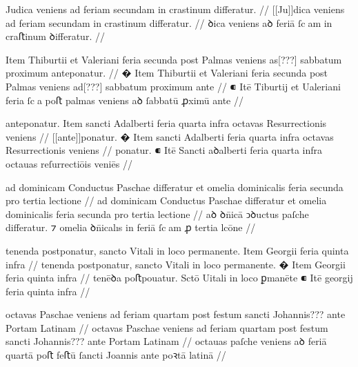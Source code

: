 \ex \bg
\gla
{}
Judica veniens ad feriam secundam
in crastinum differatur.
//
\glRekonstrukcja
{}
[[Ju]]dica veniens ad feriam secundam
in crastinum differatur.
//
\glU
{}
ꝺica veniens aꝺ feriā ſcam in craﬅinum ꝺiﬀeratur.
//
\endgl
\xe



\ex \bg
\gla
{}
{} Item Thiburtii et Valeriani feria secunda post Palmas veniens as[???]
sabbatum proximum anteponatur.
//
\glRekonstrukcja
{}
� Item Thiburtii et Valeriani feria secunda post Palmas veniens ad[???]
sabbatum proximum ante
//
\glU
{}
⁌ Itē Tiburtij et Ualeriani feria ſca poﬅ palmas veniens aꝺ ſabbatū ꝓximū ante
//
\endgl
\xe



\ex \bg
\gla
{}
anteponatur.
{} Item sancti Adalberti feria quarta infra octavas Resurrectionis
veniens
//
\glRekonstrukcja
{}
[[ante]]ponatur.
� Item sancti Adalberti feria quarta infra octavas Resurrectionis
veniens
//
\glU
{}
ponatur. ⁌ Itē Sancti aꝺalberti feria quarta infra octauas reſurrectiōis veniēs
//
\endgl
\xe



\ex \bg
\gla
{}
ad dominicam Conductus Paschae differatur et omelia dominicalis {} feria secunda pro tertia lectione
//
\glRekonstrukcja
{}
ad dominicam Conductus Paschae differatur et omelia dominicalis {}feria secunda pro tertia lectione
//
\glU
{}
aꝺ ꝺn̄icā ↄꝺuctus paſche diﬀeratur. ⁊ omelia ꝺn̄icalıs in feriā ſcam ꝓ tertia lcōne
//
\endgl
\xe



\ex \bg
\gla
{}
tenenda postponatur, sancto Vitali
in loco permanente.
{} Item Georgii feria quinta infra
//
\glRekonstrukcja
{}
tenenda postponatur, sancto Vitali
in loco permanente.
� Item Georgii feria quinta infra
//
\glU
{}
tenēꝺa poﬅpouatur. Sctō Uitali in loco ꝑmanēte ⁌ Itē georgij feria quinta infra
//
\endgl
\xe




\ex \bg
\gla
{}
octavas Paschae veniens ad feriam
quartam post festum sancti Johannis{???} ante Portam Latinam 
//
\glRekonstrukcja
{}
octavas Paschae veniens ad feriam
quartam post festum sancti Johannis{???} ante Portam Latinam 
//
\glU
{}
octauas paſche veniens aꝺ feriā quartā poﬅ feﬅū ſancti Joannis ante poꝛtā latinā 
//
\endgl
\xe






